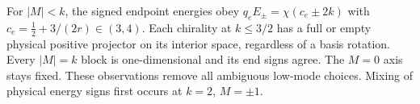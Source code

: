 For $|M|<k$, the signed endpoint energies obey $q_eE_\pm=\chi(c_e\pm2k)$ with $c_e=\tfrac12+3/(2r)\in(3,4)$. Each chirality at $k\le3/2$ has a full or empty physical positive projector on its interior space, regardless of a basis rotation. Every $|M|=k$ block is one-dimensional and its end signs agree. The $M=0$ axis stays fixed. These observations remove all ambiguous low-mode choices. Mixing of physical energy signs first occurs at $k=2$, $M=\pm1$.
